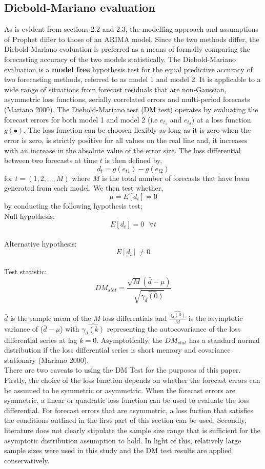 \documentclass[12pt,a4paper]{article}
\numberwithin{equation}{section}
\numberwithin{figure}{section}
\numberwithin{table}{section}
\begin{document}
\subsection{Diebold-Mariano
evaluation}\label{diebold-mariano-evaluation}

As is evident from sections 2.2 and 2.3, the modelling approach and
assumptions of Prophet differ to those of an ARIMA model. Since the two
methods differ, the Diebold-Mariano evaluation is preferred as a means
of formally comparing the forecasting accuracy of the two models
statistically. The Diebold-Mariano evaluation is a \textbf{model free}
hypothesis test for the equal predictive accuracy of two forecasting
methods, referred to as model 1 and model 2. It is applicable to a wide
range of situations from forecast residuals that are non-Gaussian,
asymmetric loss functions, serially correlated errors and multi-period
forecasts (Mariano 2000). The Diebold-Mariano test (DM test) operates by
evaluating the forecast errors for both model 1 and model 2 (i.e
\(e_{t_1}\) and \(e_{t_2}\)) at a loss function \(g(\bullet)\). The loss
function can be choosen flexibly as long as it is zero when the error is
zero, is strictly positive for all values on the real line and, it
increases with an increase in the absolute value of the error size. The
loss differential between two forecasts at time \(t\) is then defined
by, \[ d_t =  g(e_{t1}) - g(e_{t2})\] for \(t = (1, 2, ..., M)\) where
\(M\) is the total number of forecasts that have been generated from
each model. We then test whether, \[ \mu = E[d_t] = 0 \] by conducting
the following hypothesis test;\\
Null hypothesis: \[ E[d_t] = 0  \,\,\,\, \forall t\]\\
Alternative hypothesis: \[ E[d_t] \neq 0 \]\\
Test statistic:
\[DM_{stat} = \frac{\sqrt M (\bar{d} - \mu)}{\sqrt{\hat{\gamma_d(0)}}} \]

\(\bar{d}\) is the sample mean of the \(M\) loss differentials and
\(\frac{\hat{\gamma_d(0)}}{M}\) is the asymptotic variance of
(\(\bar{d} - \mu\)) with \(\hat{\gamma_d(k)}\) representing the
autocovariance of the loss differential series at lag \(k=0\).
Asymptotically, the \(DM_{stat}\) has a standard normal distribution if
the loss differential series is short memory and covariance stationary
(Mariano 2000).\\
There are two caveats to using the DM Test for the purposes of this
paper. Firstly, the choice of the loss function depends on whether the
forecast errors can be assumed to be symmetric or asymmetric. When the
forecast errors are symmetric, a linear or quadratic loss function can
be used to evaluate the loss differential. For forecast errors that are
asymmetric, a loss fuction that satisfies the conditions outlined in the
first part of this section can be used. Secondly, literature does not
clearly stipulate the sample size range that is sufficient for the
asymptotic distribution assumption to hold. In light of this, relatively
large sample sizes were used in this study and the DM test results are
applied conservatively.
\end{document}
